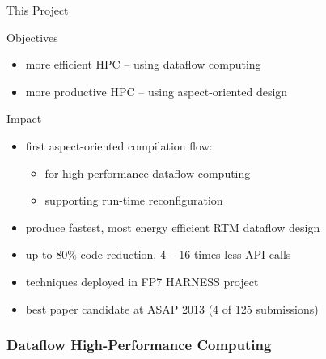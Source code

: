 \begin{frame}{This Project}
  \begin{beamerboxesrounded}{Objectives}
    \begin{itemize}
    \item more efficient HPC -- using dataflow computing
    \item more productive HPC -- using aspect-oriented design
    \end{itemize}
  \end{beamerboxesrounded}
  \vspace{0.3cm}
  \begin{beamerboxesrounded}{Impact}
    \begin{itemize}
    \item first aspect-oriented compilation flow:
      \begin{itemize}
      \item for high-performance dataflow computing
      \item supporting run-time reconfiguration
      \end{itemize}
    \item produce fastest, most energy efficient RTM dataflow design
    \item up to 80\% code reduction, 4 -- 16 times less API calls
    \item techniques deployed in FP7 HARNESS project
    \item best paper candidate at ASAP 2013 (4 of 125 submissions)
    \end{itemize}
  \end{beamerboxesrounded}
\end{frame}

\begin{frame}
  \frametitle{Dataflow High-Performance Computing}
  \begin{figure}[!ht]
    \centering
    \def\svgwidth{0.9\linewidth}
    
  \end{figure}
\end{frame}

